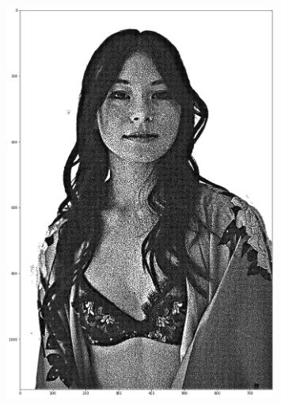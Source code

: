 \documentclass[12pt]{book}
\begin{document}
\begin{figure}
        \centering
        \includegraphics[width=0.8\textwidth]{figures/ofig/marie_nice_render.png}
    \end{figure}
\end{document}
